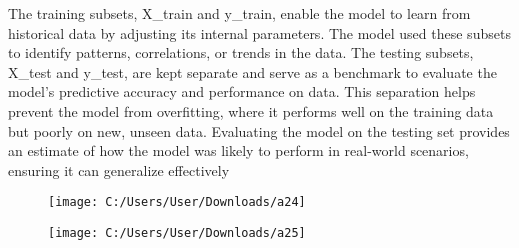 \documentclass[12pt]{article}
\begin{document}
The training subsets, X\_train and y\_train, enable the model to learn from historical data by adjusting its internal parameters. The model used these subsets to identify patterns, correlations, or trends in the data. The testing subsets, X\_test and y\_test, are kept separate and serve as a benchmark to evaluate the model’s predictive accuracy and performance on data. This separation helps prevent the model from overfitting, where it performs well on the training data but poorly on new, unseen data. Evaluating the model on the testing set provides an estimate of how the model was likely to perform in real-world scenarios, ensuring it can generalize effectively\\
\vspace{-10mm}
\begin{figure}[h!]
	\centering
	\texttt{[image: C:/Users/User/Downloads/a24]}
\end{figure}
\vspace{-10mm}
\begin{figure}[h!]
	\centering
	\texttt{[image: C:/Users/User/Downloads/a25]}
\end{figure}
\vspace{-6mm}
\end{document}
